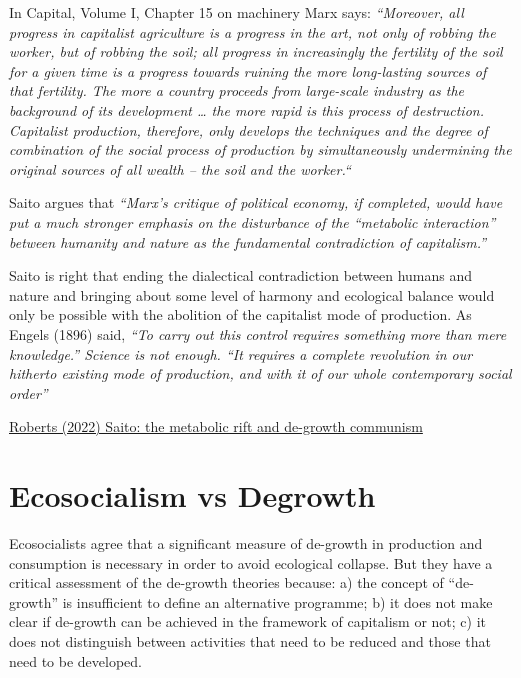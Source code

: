 \documentclass[
]{book}
\begin{document}
In Capital, Volume I, Chapter 15 on machinery Marx says: \emph{``Moreover, all progress in capitalist agriculture is a progress in the art, not only of robbing the worker, but of robbing the soil; all progress in increasingly the fertility of the soil for a given time is a progress towards ruining the more long-lasting sources of that fertility. The more a country proceeds from large-scale industry as the background of its development \ldots{} the more rapid is this process of destruction. Capitalist production, therefore, only develops the techniques and the degree of combination of the social process of production by simultaneously undermining the original sources of all wealth -- the soil and the worker.``}

Saito argues that \emph{``Marx's critique of political economy, if completed, would have put a much stronger emphasis on the disturbance of the ``metabolic interaction'' between humanity and nature as the fundamental contradiction of capitalism.''}

Saito is right that ending the dialectical contradiction between humans and nature and bringing about some level of harmony and ecological balance would only be possible with the abolition of the capitalist mode of production. As Engels (1896) said, \emph{``To carry out this control requires something more than mere knowledge.'' Science is not enough. ``It requires a complete revolution in our hitherto existing mode of production, and with it of our whole contemporary social order''}

\href{https://thenextrecession.wordpress.com/2022/11/27/saito-the-metabolic-rift-and-de-growth-communism/}{Roberts (2022) Saito: the metabolic rift and de-growth communism}

\hypertarget{ecosocialism-vs-degrowth}{%
\section{Ecosocialism vs Degrowth}\label{ecosocialism-vs-degrowth}}

Ecosocialists agree that a significant measure of de-growth in production and consumption is necessary in order to avoid ecological collapse. But they have a critical assessment of the de-growth theories because: a) the concept of ``de-growth'' is insufficient to define an alternative programme; b) it does not make clear if de-growth can be achieved in the framework of capitalism or not; c) it does not distinguish between activities that need to be reduced and those that need to be developed.
\end{document}
